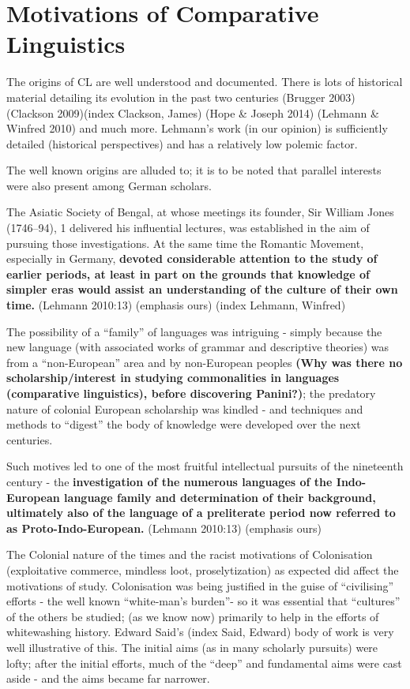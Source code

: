 \section*{Motivations of Comparative Linguistics}

The origins of CL are well understood and documented. There is lots of historical material detailing its evolution in the past two centuries (Brugger 2003) (Clackson 2009)(index Clackson, James) (Hope \& Joseph 2014) (Lehmann \& Winfred 2010) and much more. Lehmann’s work (in our opinion) is sufficiently detailed (historical perspectives) and has a relatively low polemic factor.

The well known origins are alluded to; it is to be noted that parallel interests were also present among German scholars.

\begin{myquote}
The Asiatic Society of Bengal, at whose meetings its founder, Sir William Jones (1746–94), 1 delivered his influential lectures, was established in the aim of pursuing those investigations. At the same time the Romantic Movement, especially in Germany, \textbf{devoted considerable attention to the study of earlier periods, at least in part on the grounds that knowledge of simpler eras would assist an understanding of the culture of their own time.} (Lehmann 2010:13) (emphasis ours) (index Lehmann, Winfred)
\end{myquote}

The possibility of a “family” of languages was intriguing - simply because the new language (with associated works of grammar and descriptive theories) was from a “non-European” area and by non-European peoples \textbf{(Why was there no scholarship/interest in studying commonalities in languages (comparative linguistics), before discovering Panini?)}; the predatory nature of colonial European scholarship was kindled - and techniques and methods to “digest” the body of knowledge were developed over the next centuries.

\begin{myquote}
Such motives led to one of the most fruitful intellectual pursuits of the nineteenth century - the \textbf{investigation of the numerous languages of the Indo-European language family and determination of their background, ultimately also of the language of a preliterate period now referred to as Proto-Indo-European. } (Lehmann 2010:13) (emphasis ours)
\end{myquote}

The Colonial nature of the times and the racist motivations of Colonisation (exploitative commerce, mindless loot, proselytization) as expected did affect the motivations of study. Colonisation was being justified in the guise of “civilising” efforts - the well known “white-man’s burden”- so it was essential that “cultures” of the others be studied; (as we know now) primarily to help in the efforts of whitewashing history. Edward Said’s (index Said, Edward) body of work is very well illustrative of this. The initial aims (as in many scholarly pursuits) were lofty; after the initial efforts, much of the “deep” and fundamental aims were cast aside - and the aims became far narrower.

